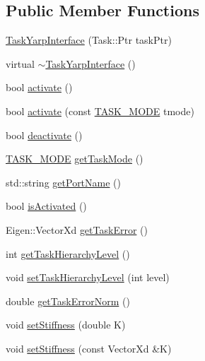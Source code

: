 \subsection*{Public Member Functions}
\begin{DoxyCompactItemize}
\item 
\hyperlink{classocra_1_1TaskYarpInterface_a152f24acc269a21955f1649de712938b}{Task\+Yarp\+Interface} (Task\+::\+Ptr task\+Ptr)
\item 
virtual \hyperlink{classocra_1_1TaskYarpInterface_a61d873b107d555d393746e79ba962fc6}{$\sim$\+Task\+Yarp\+Interface} ()
\item 
bool \hyperlink{classocra_1_1TaskYarpInterface_abf74ad0cab419197271b1d476522f0bf}{activate} ()
\item 
bool \hyperlink{classocra_1_1TaskYarpInterface_a787a849cd5abd30816d5f2a9abceb9d6}{activate} (const \hyperlink{namespaceocra_a2ed783528071ed7ee7a57d923637595f}{T\+A\+S\+K\+\_\+\+M\+O\+DE} tmode)
\item 
bool \hyperlink{classocra_1_1TaskYarpInterface_a4189dabbbaf0e5efe338dfb94e506407}{deactivate} ()
\item 
\hyperlink{namespaceocra_a2ed783528071ed7ee7a57d923637595f}{T\+A\+S\+K\+\_\+\+M\+O\+DE} \hyperlink{classocra_1_1TaskYarpInterface_a37db4979419a10881dd8f888330cfa28}{get\+Task\+Mode} ()
\item 
std\+::string \hyperlink{classocra_1_1TaskYarpInterface_a9b8f66267bb3a92b4d5bf3e2154fd27d}{get\+Port\+Name} ()
\item 
bool \hyperlink{classocra_1_1TaskYarpInterface_ad5e0f75caab96459b864699b18fd60ff}{is\+Activated} ()
\item 
Eigen\+::\+Vector\+Xd \hyperlink{classocra_1_1TaskYarpInterface_aba04c31ffba30d3fb42dd82b0529a7b8}{get\+Task\+Error} ()
\item 
int \hyperlink{classocra_1_1TaskYarpInterface_a2f15f22139495aa6c70b7b957cf1c27d}{get\+Task\+Hierarchy\+Level} ()
\item 
void \hyperlink{classocra_1_1TaskYarpInterface_a689d81f3b07ffa4e0d10413013cc4ee9}{set\+Task\+Hierarchy\+Level} (int level)
\item 
double \hyperlink{classocra_1_1TaskYarpInterface_af42ea4ecfb28af2f865efdfd40e5dc85}{get\+Task\+Error\+Norm} ()
\item 
void \hyperlink{classocra_1_1TaskYarpInterface_ac95555408e5b6b834066cf9e88572b1e}{set\+Stiffness} (double K)
\item 
void \hyperlink{classocra_1_1TaskYarpInterface_aa97913caf4381af86b5f84d404fac832}{set\+Stiffness} (const Vector\+Xd \&K)

\end{DoxyCompactItemize}
